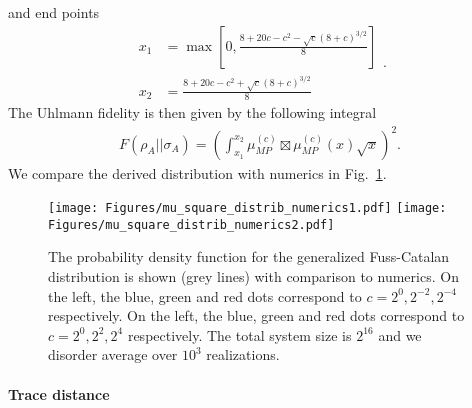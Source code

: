 \documentclass[a4paper,11pt]{article}
\begin{document}
and end points
\begin{equation}
\begin{split}
x_1 &= \max\left[0,\frac{8+20c-c^2-\sqrt{c}(8+c)^{3/2}}{8} \right]\\
x_2 &= \frac{8+20c-c^2+\sqrt{c}(8+c)^{3/2}}{8}
\end{split} .
\end{equation}
The Uhlmann fidelity is then given by the following integral
\begin{align}
    F(\rho_A ||\sigma_A) = \left(\int_{x_1}^{x_2} \mu^{(c)}_{MP} \boxtimes \mu^{(c)}_{MP}(x) \sqrt{x} \right)^2.
\end{align}
We compare the derived distribution with numerics in Fig.~\ref{mu_square_distrib_numerics}.

\begin{figure}
    \centering
    \texttt{[image: Figures/mu\_square\_distrib\_numerics1.pdf]}
    \texttt{[image: Figures/mu\_square\_distrib\_numerics2.pdf]}
    \caption{The probability density function for the generalized Fuss-Catalan distribution is shown (grey lines) with comparison to numerics. On the left, the blue, green and red dots correspond to $c = {2^0,2^{-2}, 2^{-4}}$ respectively. On the left, the blue, green and red dots correspond to $c = {2^0,2^{2}, 2^{4}}$ respectively. The total system size is $2^{16}$ and we disorder average over $10^3$ realizations.}
    \label{mu_square_distrib_numerics}
\end{figure}

\paragraph{Trace distance}
\end{document}
